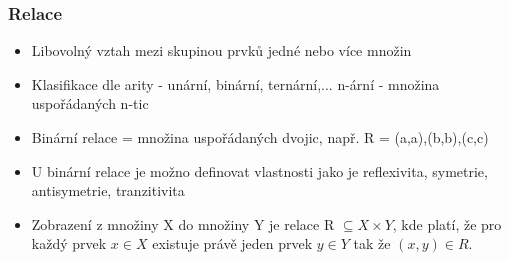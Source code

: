 \documentclass[10pt,a4paper]{article}
\begin{document}
\subsubsection{Relace}

\begin{itemize}
\item Libovolný vztah mezi skupinou prvků jedné nebo více množin
\item Klasifikace dle arity - unární, binární, ternární,... n-ární - množina uspořádaných n-tic
\item Binární relace = množina uspořádaných dvojic, např. R = {(a,a),(b,b),(c,c)}
\item U binární relace je možno definovat vlastnosti jako je reflexivita, symetrie, antisymetrie, tranzitivita
\item Zobrazení z množiny X do množiny Y je relace R $\subseteq  X \times Y $, kde platí, že pro každý prvek $x \in X$ existuje právě jeden prvek $y \in Y$ tak že $(x, y) \in R$.
\end{itemize}
\end{document}
